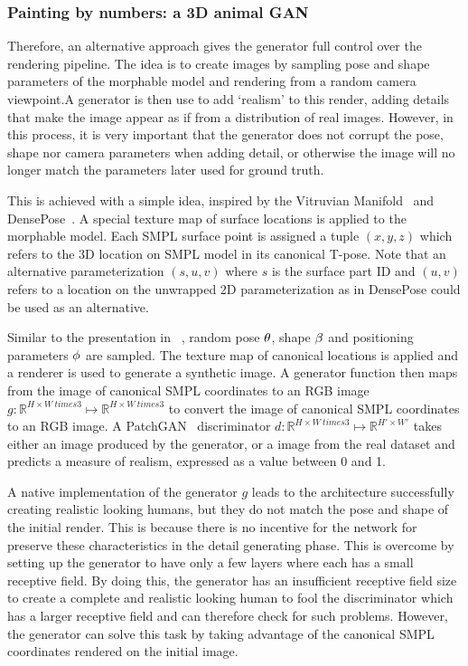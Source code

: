 \subsubsection{Painting by numbers: a 3D animal GAN}

Therefore, an alternative approach gives the generator full control over the rendering pipeline. The idea is to create images by sampling pose and shape parameters of the morphable model and rendering from a random camera viewpoint.A generator is then use to add `realism' to this render, adding details that make the image appear as if from a distribution of real images. However, in this process, it is very important that the generator does not corrupt the pose, shape nor camera parameters when adding detail, or otherwise the image will no longer match the parameters later used for ground truth. 

This is achieved with a simple idea, inspired by the Vitruvian Manifold~ and DensePose~. A special texture map of surface locations is applied to the morphable model. Each SMPL surface point is assigned a tuple $(x,y,z)$ which refers to the 3D location on SMPL model in its canonical T-pose. Note that an alternative parameterization $(s,u,v)$ where $s$ is the surface part ID and $(u,v)$ refers to a location on the unwrapped 2D parameterization as in DensePose could be used as an alternative.

Similar to the presentation in ~, random pose $\theta$, shape $\beta$ and positioning parameters $\phi$ are sampled. The texture map of canonical locations is applied and a renderer is used to generate a synthetic image. A generator function then maps from the image of canonical SMPL coordinates to an RGB image $g: \mathbb{R}^{H \times W \ times 3} \mapsto \mathbb{R}^{H \times W \ times 3}$ to convert the image of canonical SMPL coordinates to an RGB image. A PatchGAN~ discriminator $d: \mathbb{R}^{H \times W \ times 3} \mapsto \mathbb{R}^{H' \times W'}$ takes either an image produced by the generator, or a image from the real dataset and predicts a measure of realism, expressed as a value between 0 and 1.

A native implementation of the generator $g$ leads to the architecture successfully creating realistic looking humans, but they do not match the pose and shape of the initial render. This is because there is no incentive for the network for preserve these characteristics in the detail generating phase. This is overcome by setting up the generator to have only a few layers where each has a small receptive field. By doing this, the generator has an insufficient receptive field size to create a complete and realistic looking human to fool the discriminator which has a larger receptive field and can therefore check for such problems. However, the generator can solve this task by taking advantage of the canonical SMPL coordinates rendered on the initial image. 

